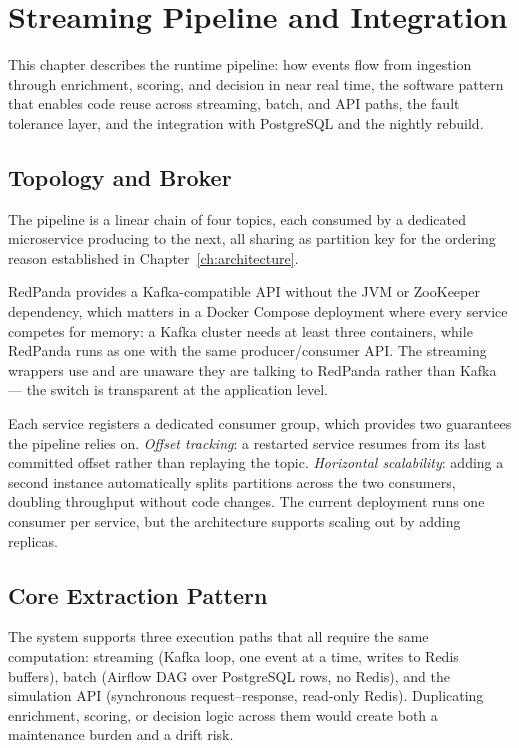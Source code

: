\chapter{Streaming Pipeline and Integration}
\label{ch:streaming}

This chapter describes the runtime pipeline: how events flow from ingestion through enrichment, scoring, and decision in near real time, the software pattern that enables code reuse across streaming, batch, and API paths, the fault tolerance layer, and the integration with PostgreSQL and the nightly rebuild.

\section{Topology and Broker}

The pipeline is a linear chain of four topics, each consumed by a dedicated microservice producing to the next, all sharing  as partition key for the ordering reason established in Chapter~\ref{ch:architecture}.

RedPanda provides a Kafka-compatible API without the JVM or ZooKeeper dependency, which matters in a Docker Compose deployment where every service competes for memory: a Kafka cluster needs at least three containers, while RedPanda runs as one with the same producer/consumer API. The streaming wrappers use  and are unaware they are talking to RedPanda rather than Kafka --- the switch is transparent at the application level.

Each service registers a dedicated consumer group, which provides two guarantees the pipeline relies on. \emph{Offset tracking}: a restarted service resumes from its last committed offset rather than replaying the topic. \emph{Horizontal scalability}: adding a second instance automatically splits partitions across the two consumers, doubling throughput without code changes. The current deployment runs one consumer per service, but the architecture supports scaling out by adding replicas.

\section{Core Extraction Pattern}

The system supports three execution paths that all require the same computation: streaming (Kafka loop, one event at a time, writes to Redis buffers), batch (Airflow DAG over PostgreSQL rows, no Redis), and the simulation API (synchronous request--response, read-only Redis). Duplicating enrichment, scoring, or decision logic across them would create both a maintenance burden and a drift risk.

